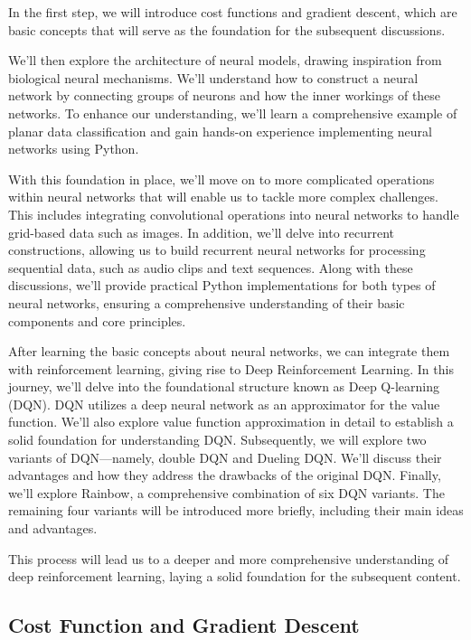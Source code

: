 \documentclass{article}
\begin{document}
In the first step, we will introduce cost functions and gradient descent, which are basic concepts that will serve as the foundation for the subsequent discussions.

We'll then explore the architecture of neural models, drawing inspiration from biological neural mechanisms. We'll understand how to construct a neural network by connecting groups of neurons and how the inner workings of these networks. To enhance our understanding, we'll learn a comprehensive example of planar data classification and gain hands-on experience implementing neural networks using Python.

With this foundation in place, we'll move on to more complicated operations within neural networks that will enable us to tackle more complex challenges. This includes integrating convolutional operations into neural networks to handle grid-based data such as images. In addition, we'll delve into recurrent constructions, allowing us to build recurrent neural networks for processing sequential data, such as audio clips and text sequences. Along with these discussions, we'll provide practical Python implementations for both types of neural networks, ensuring a comprehensive understanding of their basic components and core principles.

After learning the basic concepts about neural networks, we can integrate them with reinforcement learning, giving rise to Deep Reinforcement Learning. In this journey, we'll delve into the foundational structure known as Deep Q-learning (DQN). DQN utilizes a deep neural network as an approximator for the value function. We'll also explore value function approximation in detail to establish a solid foundation for understanding DQN. Subsequently, we will explore two variants of DQN—namely, double DQN and Dueling DQN. We'll discuss their advantages and how they address the drawbacks of the original DQN. Finally, we'll explore Rainbow, a comprehensive combination of six DQN variants. The remaining four variants will be introduced more briefly, including their main ideas and advantages.

This process will lead us to a deeper and more comprehensive understanding of deep reinforcement learning, laying a solid foundation for the subsequent content.


    \newpage
	\subsection{Cost Function and Gradient Descent}
\end{document}
